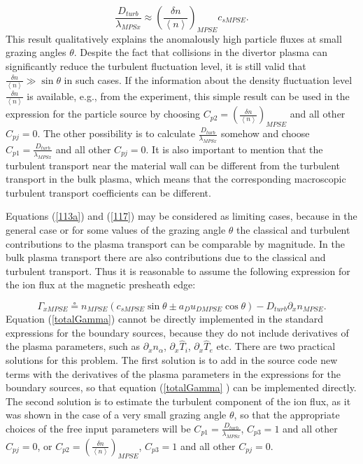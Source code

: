 \documentclass[11pt]{article}
\begin{document}
\begin{equation}
\frac{D_{turb}}{\lambda_{MPSx}}\approx\left( \frac{\delta n}{\left\langle
n\right\rangle }\right) _{MPSE}c_{sMPSE}\text{.}   \label{122}
\end{equation}
This result qualitatively explains the anomalously high particle fluxes at
small grazing angles $\theta$. Despite the fact that collisions in the
divertor plasma can significantly reduce the turbulent fluctuation level, it
is still valid that $\frac{\delta n}{\left\langle n\right\rangle }\gg
\sin\theta$ in such cases. If the information about the density fluctuation
level $\frac{\delta n}{\left\langle n\right\rangle }$ is available, e.g.,
from the experiment, this simple result can be used in the expression for
the particle source by choosing $C_{p2}=\left( \frac{\delta n}{\left\langle
n\right\rangle }\right) _{MPSE}$ and all other $C_{pj}=0$. The other
possibility is to calculate $\frac{D_{turb}}{\lambda_{MPSx}}$ somehow and
choose $C_{p1}=\frac{D_{turb}}{\lambda_{MPSx}}$ and all other $C_{pj}=0$. It
is also important to mention that the turbulent transport near the material
wall can be different from the turbulent transport in the bulk plasma, which
means that the corresponding macroscopic turbulent transport coefficients
can be different.

\bigskip

Equations (\ref{113a}) and (\ref{117}) may be considered as limiting cases,
because in the general case or for some values of the grazing angle $\theta$
the classical and turbulent contributions to the plasma transport can be
comparable by magnitude. In the bulk plasma transport there are also
contributions due to the classical and turbulent transport. Thus it is
reasonable to assume the following expression for the ion flux at the
magnetic presheath edge:

\begin{equation}
\Gamma_{xMPSE}\circeq n_{MPSE}\left( c_{sMPSE}\sin\theta\pm
a_{D}u_{DMPSE}\cos\theta\right) -D_{turb}\partial_{x}n_{MPSE}\text{.} 
\label{totalGamma}
\end{equation}
Equation (\ref{totalGamma}) cannot be directly implemented in the standard
expressions for the boundary sources, because they do not include
derivatives of the plasma parameters, such as $\partial_{x}n_{\alpha}$, $%
\partial _{x}\widehat{T}_{i}$, $\partial_{x}\widehat{T}_{e}$ etc. There are
two practical solutions for this problem. The first solution is to add in
the source code new terms with the derivatives of the plasma parameters in
the expressions for the boundary sources, so that equation (\ref{totalGamma}%
) can be implemented directly. The second solution is to estimate the
turbulent component of the ion flux, as it was shown in the case of a very
small grazing angle $\theta$, so that the appropriate choices of the free
input parameters will be $C_{p1}=\frac{D_{turb}}{\lambda_{MPSx}}$, $C_{p3}=1$
and all other $C_{pj}=0$, or $C_{p2}=\left( \frac{\delta n}{\left\langle
n\right\rangle }\right) _{MPSE}$, $C_{p3}=1$ and all other $C_{pj}=0$.
\end{document}

